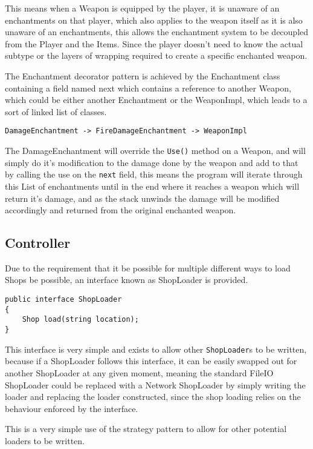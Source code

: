\documentclass[12pt,titlepage]{article}
\begin{document}
This means when a Weapon is equipped by the player, it is unaware of an enchantments on that player, which also applies to the weapon itself as it is also unaware of an enchantments, this allows the enchantment system to be decoupled from the Player and the Items. Since the player doesn't need to know the actual subtype or the layers of wrapping required to create a specific enchanted weapon.

The Enchantment decorator pattern is achieved by the Enchantment class containing a field named next which contains a reference to another Weapon, which could be either another Enchantment or the WeaponImpl, which leads to a sort of linked list of classes.

\begin{verbatim}
DamageEnchantment -> FireDamageEnchantment -> WeaponImpl
\end{verbatim}

The DamageEnchantment will override the \texttt{Use()} method on a Weapon, and will simply do it's modification to the damage done by the weapon and add to that by calling the use on the \texttt{next} field, this means the program will iterate through this List of enchantments until in the end where it reaches a weapon which will return it's damage, and as the stack unwinds the damage will be modified accordingly and returned from the original enchanted weapon.

\newpage
\subsection{Controller}
Due to the requirement that it be possible for multiple different ways to load Shops be possible, an interface known as ShopLoader is provided.

\begin{verbatim}
public interface ShopLoader
{
    Shop load(string location);
}
\end{verbatim}

This interface is very simple and exists to allow other \texttt{ShopLoader}s to be written, because if a ShopLoader follows this interface, it can be easily swapped out for another ShopLoader at any given moment, meaning the standard FileIO ShopLoader could be replaced with a Network ShopLoader by simply writing the loader and replacing the loader constructed, since the shop loading relies on the behaviour enforced by the interface.

This is a very simple use of the strategy pattern to allow for other potential loaders to be written.
\end{document}
